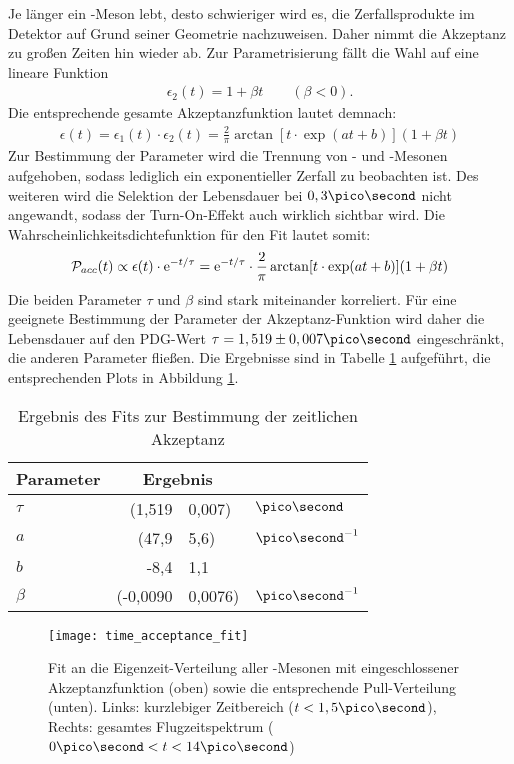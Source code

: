 Je länger ein \Bd-Meson lebt, desto schwieriger wird es, die Zerfallsprodukte im Detektor auf Grund seiner Geometrie nachzuweisen. Daher nimmt die Akzeptanz zu großen Zeiten hin wieder ab. Zur Parametrisierung fällt die Wahl auf eine lineare Funktion
\begin{align}
\epsilon_2(t) = 1 + \beta t \qquad (\beta < 0).
\end{align}
Die entsprechende gesamte Akzeptanzfunktion lautet demnach:
\begin{align}
\epsilon(t) = \epsilon_1(t) \cdot \epsilon_2(t) = \frac{2}{\pi}\arctan[t\cdot \exp(at+b)](1 + \beta t)
\end{align}
Zur Bestimmung der Parameter wird die Trennung von \Bd- und \Bdbar-Mesonen aufgehoben, sodass lediglich ein exponentieller Zerfall zu beobachten ist. Des weiteren wird die Selektion der Lebensdauer bei $0,3\pico\second$ nicht angewandt, sodass der Turn-On-Effekt auch wirklich sichtbar wird. Die Wahrscheinlichkeitsdichtefunktion für den Fit lautet somit:
\begin{align}
\mathcal{P}_{acc}(t) \propto \epsilon(t)\cdot \mathrm{e}^{-t/\tau} = \mathrm{e}^{-t/\tau}\cdot\frac{2}{\pi}\arctan[t\cdot \exp(at+b)](1 + \beta t)
\end{align}
Die beiden Parameter $\tau$ und $\beta$ sind stark miteinander korreliert. Für eine geeignete Bestimmung der Parameter der Akzeptanz-Funktion wird daher die Lebensdauer auf den PDG-Wert $\tau = 1,519 \pm 0,007 \pico\second$ \cite{pdg-tau} eingeschränkt, die anderen Parameter fließen. Die Ergebnisse sind in Tabelle \ref{tab:fit_akzeptanz} aufgeführt, die entsprechenden Plots in Abbildung \ref{fig:fit_akzeptanz}. 

\begin{table}[hptb]
\centering
\caption{Ergebnis des Fits zur Bestimmung der zeitlichen Akzeptanz}
\label{tab:fit_akzeptanz}
\begin{tabular}{lr@{$\pm$}ll}
\hline \hline 
Parameter & \multicolumn{2}{c}{Ergebnis} & \\ \hline
$\tau$    &  (1,519   & 0,007) & $\ps$ \\
$a $       &  (47,9    & 5,6) & $\ps^{-1}$ \\
$b$       &  -8,4    & 1,1 \\
$\beta$   &  (-0,0090 & 0,0076) & $\ps^{-1}$ \\ 
\hline \hline
\end{tabular}
\end{table}

\begin{figure}[hptb]
\centering
\texttt{[image: time\_acceptance\_fit]}
\caption{Fit an die Eigenzeit-Verteilung aller \Bd-Mesonen mit eingeschlossener Akzeptanzfunktion (oben) sowie die entsprechende Pull-Verteilung (unten). Links: kurzlebiger Zeitbereich ($t<1,5\pico\second$), Rechts: gesamtes Flugzeitspektrum ($0\ps < t < 14\ps$)}
\label{fig:fit_akzeptanz}
\end{figure}

